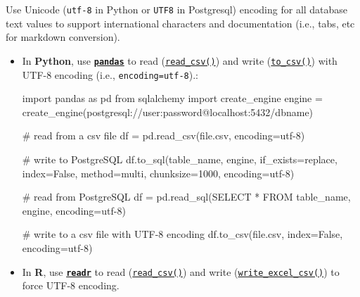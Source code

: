 \documentclass[
  letterpaper,
  DIV=11,
  numbers=noendperiod]{scrreprt}
\newenvironment{Shaded}{\begin{snugshade}}{\end{snugshade}}
\newcommand{\CommentTok}[1]{\textcolor[rgb]{0.37,0.37,0.37}{#1}}
\newcommand{\DecValTok}[1]{\textcolor[rgb]{0.68,0.00,0.00}{#1}}
\newcommand{\ImportTok}[1]{\textcolor[rgb]{0.00,0.46,0.62}{#1}}
\newcommand{\NormalTok}[1]{\textcolor[rgb]{0.00,0.23,0.31}{#1}}
\newcommand{\OperatorTok}[1]{\textcolor[rgb]{0.37,0.37,0.37}{#1}}
\newcommand{\StringTok}[1]{\textcolor[rgb]{0.13,0.47,0.30}{#1}}
\newcommand{\VariableTok}[1]{\textcolor[rgb]{0.07,0.07,0.07}{#1}}
\begin{document}
Use Unicode (\texttt{utf-8} in Python or \texttt{UTF8} in Postgresql)
encoding for all database text values to support international
characters and documentation (i.e., tabs, etc for markdown conversion).

\begin{itemize}
\item
  In \textbf{Python}, use
  \href{https://pandas.pydata.org/docs/index.html}{\textbf{\texttt{pandas}}}
  to read
  (\href{https://pandas.pydata.org/docs/reference/api/pandas.read_csv.html}{\texttt{read\_csv()}})
  and write
  (\href{https://pandas.pydata.org/docs/reference/api/pandas.DataFrame.to_csv.html}{\texttt{to\_csv()}})
  with UTF-8 encoding (i.e.,
  \texttt{encoding=\textquotesingle{}utf-8\textquotesingle{}}).:

\begin{Shaded}
\begin{Highlighting}[]
\ImportTok{import}\NormalTok{ pandas }\ImportTok{as}\NormalTok{ pd}
\ImportTok{from}\NormalTok{ sqlalchemy }\ImportTok{import}\NormalTok{ create\_engine}
\NormalTok{engine }\OperatorTok{=}\NormalTok{ create\_engine(}\StringTok{\textquotesingle{}postgresql://user:password@localhost:5432/dbname\textquotesingle{}}\NormalTok{)}

\CommentTok{\# read from a csv file}
\NormalTok{df }\OperatorTok{=}\NormalTok{ pd.read\_csv(}\StringTok{\textquotesingle{}file.csv\textquotesingle{}}\NormalTok{, encoding}\OperatorTok{=}\StringTok{\textquotesingle{}utf{-}8\textquotesingle{}}\NormalTok{)}

\CommentTok{\# write to PostgreSQL}
\NormalTok{df.to\_sql(}\StringTok{\textquotesingle{}table\_name\textquotesingle{}}\NormalTok{, engine, if\_exists}\OperatorTok{=}\StringTok{\textquotesingle{}replace\textquotesingle{}}\NormalTok{, index}\OperatorTok{=}\VariableTok{False}\NormalTok{, method}\OperatorTok{=}\StringTok{\textquotesingle{}multi\textquotesingle{}}\NormalTok{, chunksize}\OperatorTok{=}\DecValTok{1000}\NormalTok{, encoding}\OperatorTok{=}\StringTok{\textquotesingle{}utf{-}8\textquotesingle{}}\NormalTok{)}

\CommentTok{\# read from PostgreSQL}
\NormalTok{df }\OperatorTok{=}\NormalTok{ pd.read\_sql(}\StringTok{\textquotesingle{}SELECT * FROM table\_name\textquotesingle{}}\NormalTok{, engine, encoding}\OperatorTok{=}\StringTok{\textquotesingle{}utf{-}8\textquotesingle{}}\NormalTok{)}

\CommentTok{\# write to a csv file with UTF{-}8 encoding}
\NormalTok{df.to\_csv(}\StringTok{\textquotesingle{}file.csv\textquotesingle{}}\NormalTok{, index}\OperatorTok{=}\VariableTok{False}\NormalTok{, encoding}\OperatorTok{=}\StringTok{\textquotesingle{}utf{-}8\textquotesingle{}}\NormalTok{)}
\end{Highlighting}
\end{Shaded}
\item
  In \textbf{R}, use
  \href{https://readr.tidyverse.org/index.html}{\textbf{\texttt{readr}}}
  to read
  (\href{https://readr.tidyverse.org/reference/read_delim.html}{\texttt{read\_csv()}})
  and write
  (\href{https://readr.tidyverse.org/reference/write_delim.html}{\texttt{write\_excel\_csv()}})
  to force UTF-8 encoding.


\end{itemize}
\end{document}
